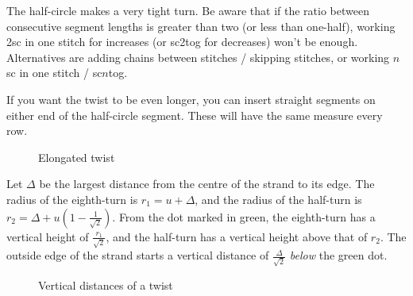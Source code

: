 \documentclass[openany]{book}
\begin{document}
The half-circle makes a very tight turn. Be aware that if the ratio  between consecutive segment lengths is greater than two (or less than one-half), 
working 2sc in one stitch for increases (or sc2tog for decreases) won't be enough. Alternatives are adding chains between stitches / skipping stitches, or working $n$ sc in one stitch / sc$n$tog.\medskip

If you want the twist to be even longer, you can insert straight segments on either end of the half-circle segment. These will have the same measure every row.
\begin{figure}[H]\centering
{}
\caption{Elongated twist}
\end{figure}


Let $\Delta$ be the largest distance from the centre of the strand to its edge. The radius of the eighth-turn is $r_1=u+\Delta$, and the radius of the half-turn is $r_2=\Delta + u\left(1-\frac1{\sqrt 2}\right)$. From the dot marked in green, the eighth-turn has a vertical height of $\frac{r_1}{\sqrt 2}$, and the half-turn has a vertical height above that of $ r_2$. The outside edge of the strand starts a vertical distance of $ \frac{\Delta}{\sqrt 2}$ \emph{below} the green dot.


\begin{figure}[H]\centering
{}
\caption{Vertical distances of a twist}
\end{figure}
\end{document}
